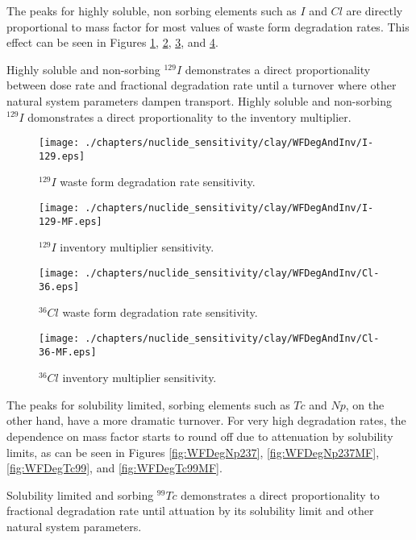 \clearpage 
The peaks for highly soluble, non sorbing elements such as $I$ and $Cl$
are directly proportional to mass factor for most 
values of waste form degradation rates. This effect can be seen in Figures 
\ref{fig:WFDegI129}, \ref{fig:WFDegI129MF}, \ref{fig:WFDegCl36}, and 
\ref{fig:WFDegCl36MF}. 


Highly soluble and non-sorbing $^{129}I$ demonstrates a direct proportionality between dose rate and 
fractional degradation rate until a turnover where other natural system 
parameters dampen transport. Highly soluble and non-sorbing $^{129}I$ domonstrates a direct 
proportionality to the inventory multiplier.

\begin{figure}[ht!]
\centering
\texttt{[image: ./chapters/nuclide\_sensitivity/clay/WFDegAndInv/I-129.eps]}
\caption{$^{129}I$ waste form degradation rate sensitivity.}
\label{fig:WFDegI129}
\end{figure}

\begin{figure}[ht!]
\centering
\texttt{[image: ./chapters/nuclide\_sensitivity/clay/WFDegAndInv/I-129-MF.eps]}
\caption{$^{129}I$ inventory multiplier sensitivity.}
\label{fig:WFDegI129MF}
\end{figure}

\begin{figure}[ht!]
\centering
\texttt{[image: ./chapters/nuclide\_sensitivity/clay/WFDegAndInv/Cl-36.eps]}
\caption{$^{36}Cl$ waste form degradation rate sensitivity.}
\label{fig:WFDegCl36}
\end{figure}

\begin{figure}[ht!]
\centering
\texttt{[image: ./chapters/nuclide\_sensitivity/clay/WFDegAndInv/Cl-36-MF.eps]}
\caption{$^{36}Cl$ inventory multiplier sensitivity.}
\label{fig:WFDegCl36MF}
\end{figure}
\clearpage

The peaks for solubility limited, sorbing elements such as $Tc$ and $Np$, on the 
other hand, have a more dramatic turnover.  For very high degradation rates, the 
dependence on mass factor starts to round off due to attenuation by solubility 
limits, as can be seen in Figures \ref{fig:WFDegNp237}, \ref{fig:WFDegNp237MF}, 
\ref{fig:WFDegTc99}, and \ref{fig:WFDegTc99MF}.

Solubility limited and sorbing $^{99}Tc$ demonstrates a direct proportionality 
to fractional degradation rate until attuation by its solubility limit and other 
natural system parameters.  

